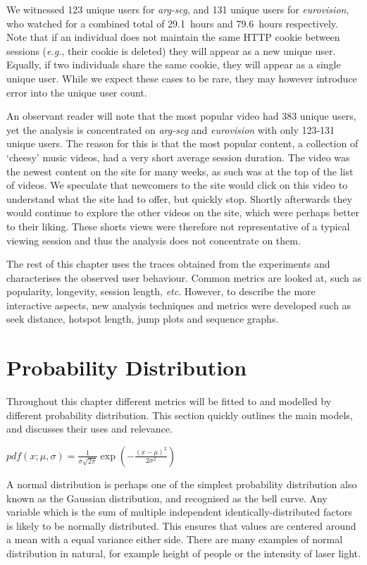We witnessed 123 unique users for \emph{arg-scg}, and 131 unique users for \emph{eurovision}, who watched for a combined total of 29.1~hours and 79.6~hours respectively. Note that if an individual does not maintain the same HTTP cookie between sessions (\emph{e.g.}, their cookie is deleted) they will appear as a new unique user. Equally, if two individuals share the same cookie, they will appear as a single unique user. While we expect these cases to be rare, they may however introduce error into the unique user count.

An observant reader will note that the most popular video had 383 unique users, yet the analysis is concentrated on \emph{arg-scg} and \emph{eurovision} with only 123-131 unique users. The reason for this is that the most popular content, a collection of `cheesy' music videos, had a very short average session duration. The video was the newest content on the site for many weeks, as such was at the top of the list of videos. We speculate that newcomers to the site would click on this video to understand what the site had to offer, but quickly stop. Shortly afterwards they would continue to explore the other videos on the site, which were perhaps better to their liking. These shorts views were therefore not representative of a typical viewing session and thus the analysis does not concentrate on them.

The rest of this chapter uses the traces obtained from the experiments and characterises the observed user behaviour. Common metrics are looked at, such as popularity, longevity, session length, \emph{etc}. However, to describe the more interactive aspects, new analysis techniques and metrics were developed such as seek distance, hotspot length, jump plots and sequence graphs.

\section{Probability Distribution}

Throughout this chapter different metrics will be fitted to and modelled by different probability distribution. This section quickly outlines the main models, and discusses their uses and relevance.

\begin{description}
  \item[Normal] {\Large $pdf(x;\mu,\sigma) = \frac{1}{\sigma \sqrt{2\pi}} \exp\left(-\frac{(x-\mu)^2}{2\sigma^2}\right)$ }

  A normal distribution is perhaps one of the simplest probability distribution also known as the Gaussian distribution, and recognised as the bell curve. Any variable which is the sum of multiple independent identically-distributed factors is likely to be normally distributed. This ensures that values are centered around a mean with a equal variance either side. There are many examples of normal distribution in natural, for example height of people or the intensity of laser light.
\end{description}

